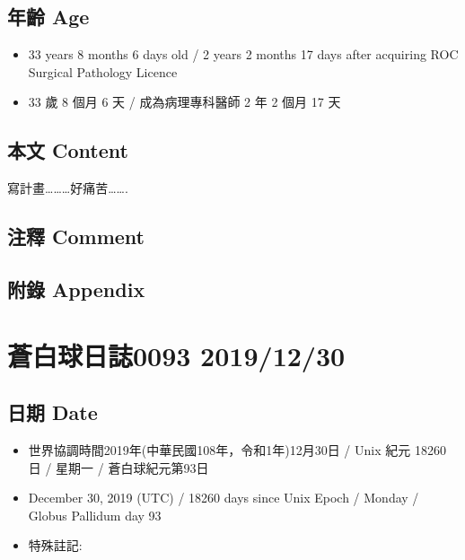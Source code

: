 \documentclass[
]{article}
\providecommand{\tightlist}{%
  \setlength{\itemsep}{0pt}\setlength{\parskip}{0pt}}
\begin{document}
\hypertarget{ux5e74ux9f61-age-28}{%
\subsection{年齡 Age}\label{ux5e74ux9f61-age-28}}

\begin{itemize}
\tightlist
\item
  33 years 8 months 6 days old / 2 years 2 months 17 days after
  acquiring ROC Surgical Pathology Licence
\item
  33 歲 8 個月 6 天 / 成為病理專科醫師 2 年 2 個月 17 天
\end{itemize}

\hypertarget{ux672cux6587-content-28}{%
\subsection{本文 Content}\label{ux672cux6587-content-28}}

寫計畫\ldots\ldots\ldots 好痛苦\ldots\ldots.

\hypertarget{ux6ce8ux91cb-comment-27}{%
\subsection{注釋 Comment}\label{ux6ce8ux91cb-comment-27}}

\hypertarget{ux9644ux9304-appendix-28}{%
\subsection{附錄 Appendix}\label{ux9644ux9304-appendix-28}}

\hypertarget{ux84bcux767dux7403ux65e5ux8a8c0093-20191230}{%
\section{蒼白球日誌0093
2019/12/30}\label{ux84bcux767dux7403ux65e5ux8a8c0093-20191230}}

\hypertarget{ux65e5ux671f-date-29}{%
\subsection{日期 Date}\label{ux65e5ux671f-date-29}}

\begin{itemize}
\tightlist
\item
  世界協調時間2019年(中華民國108年，令和1年)12月30日 / Unix 紀元 18260
  日 / 星期一 / 蒼白球紀元第93日
\item
  December 30, 2019 (UTC) / 18260 days since Unix Epoch / Monday /
  Globus Pallidum day 93
\item
  特殊註記:
\end{itemize}
\end{document}
